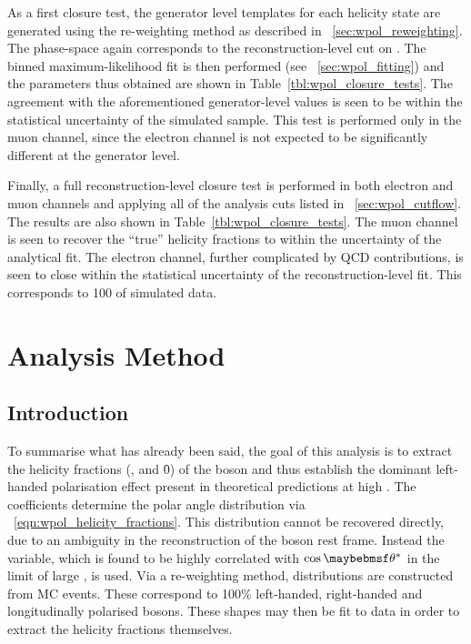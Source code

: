 As a first closure test, the generator level \LP templates for each helicity
state are generated using the re-weighting method as described in
\sec~\ref{sec:wpol_reweighting}. The phase-space again corresponds to the
reconstruction-level cut on \PtW. The binned maximum-likelihood fit is then
performed (see \sec~\ref{sec:wpol_fitting}) and the parameters thus obtained are
shown in Table~\ref{tbl:wpol_closure_tests}. The agreement with the
aforementioned generator-level values is seen to be within the statistical uncertainty
of the simulated sample. This test is performed only in the muon channel, since
the electron channel is not expected to be significantly different at the
generator level.

Finally, a full reconstruction-level closure test is performed in both electron
and muon channels and applying all of the analysis cuts listed in
\sec~\ref{sec:wpol_cutflow}. The results are also shown in
Table~\ref{tbl:wpol_closure_tests}. The muon channel is seen to recover the
``true'' helicity fractions to within the uncertainty of the analytical fit. The
electron channel, further complicated by \ac{QCD} contributions, is seen to
close within the statistical uncertainty of the reconstruction-level fit. This
corresponds to \unit{100}{\invpicobarn} of simulated data.



\section{Analysis Method}
\subsection{Introduction}
To summarise what has already been said, the goal of this analysis is to extract
the helicity fractions (\fL, \fR and \f0) of the \PW boson and thus establish
the dominant left-handed polarisation effect present in theoretical predictions
at high \PtW. The \ffi coefficients determine the polar angle distribution via
\eqn~\ref{eqn:wpol_helicity_fractions}. This distribution cannot be recovered
directly, due to an ambiguity in the reconstruction of the \PW boson rest
frame. Instead the \LP variable, which is found to be highly correlated with
$\cos\thetastar$ in the limit of large \PtW, is used. Via a re-weighting
method, \LP distributions are constructed from \ac{MC} events. These correspond
to 100\% left-handed, right-handed and longitudinally polarised \PW
bosons. These shapes may then be fit to data in order to extract the helicity
fractions themselves.

